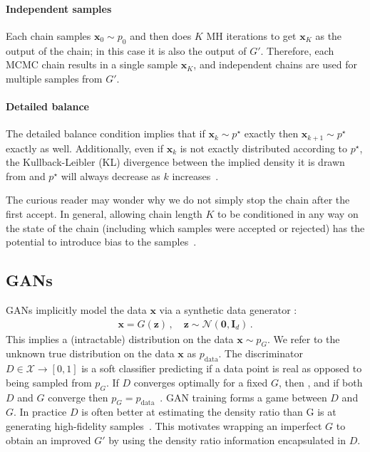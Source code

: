 \documentclass{article}
\renewcommand{\vec}[1]{{\boldsymbol{\mathbf{#1}}}} %
\newcommand{\R}{\mathbb{R}}
\newcommand{\set}[1]{\mathcal{#1}}
\newcommand{\sample}{\sim}
\newcommand{\norm}{\mathcal{N}}
\newcommand{\target}{{p^\star}}
\newcommand{\pinit}{{p_0}}
\newcommand{\PG}{{p_G}}
\newcommand{\PR}{{p_{\textrm{data}}}}
\newcommand{\setx}{\set{X}}
\begin{document}
\paragraph{Independent samples}
Each chain samples $\vec x_0 \sample \pinit$ and then does $K$ MH iterations to get $\vec x_K$ as the output of the chain; in this case it is also the output of $G'$.
Therefore, each MCMC chain results in a single sample $\vec x_K$, and independent chains are used for multiple samples from $G'$.

\paragraph{Detailed balance}
The detailed balance condition implies that if $\vec x_k \sample \target$ exactly then $\vec x_{k+1} \sample \target$ exactly as well.
Additionally, even if $\vec x_k$ is not exactly distributed according to $\target$, the Kullback-Leibler (KL) divergence between the implied density it is drawn from and $\target$ will always decrease as $k$ increases~\citep{Murray2008,Cover2012}.

The curious reader may wonder why we do not simply stop the chain after the first accept.
In general, allowing chain length $K$ to be conditioned in any way on the state of the chain (including which samples were accepted or rejected) has the potential to introduce bias to the samples~\citep{Cowles1999}.

\subsection{GANs}
\label{sec:GANs}

GANs implicitly model the data $\vec x$ via a synthetic data generator \smash{$G \in \R^{d} \rightarrow \setx$}:
\begin{align}
  \vec x = G(\vec z)\,, \quad \vec z \sample \norm(\vec 0, \vec I_{d})\,.
\end{align}
This implies a (intractable) distribution on the data $\vec x \sample \PG$.
We refer to the unknown true distribution on the data $\vec x$ as $\PR$.
The discriminator $D \in \setx \rightarrow [0,1]$ is a soft classifier predicting if a data point is real as opposed to being sampled from $\PG$\@.
If $D$ converges optimally for a fixed $G$, then \smash{$D = \PR/(\PR + \PG)$}, and if both $D$ and $G$ converge then $\PG = \PR$~\citep{Goodfellow2014}.
GAN training forms a game between $D$ and $G$.
In practice $D$ is often better at estimating the density ratio than G is at generating high-fidelity samples~\citep{Shibuya2017}.
This motivates wrapping an imperfect $G$ to obtain an improved $G'$ by using the density ratio information encapsulated in $D$.
\end{document}
